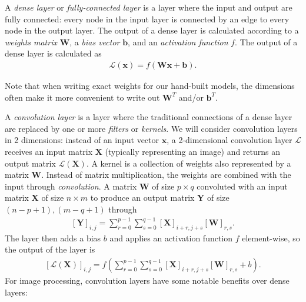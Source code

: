 \documentclass{somasmsc}
\begin{document}
A \textit{dense layer} or \textit{fully-connected layer} is a layer where the input and output are fully connected: every node in the input layer is connected by an edge to every node in the output layer. The output of a dense layer is calculated according to a \textit{weights matrix} $\mathbf{W}$, a \textit{bias vector} $\pmb{b}$, and an \textit{activation function} $f$. The output of a dense layer is calculated as
\begin{align*}
\mathcal{L}\left(\pmb{x}\right) = f(\mathbf{W}\pmb{x} + \pmb{b}).
\end{align*}

Note that when writing exact weights for our hand-built models, the dimensions often make it more convenient to write out $\mathbf{W}^T$ and/or $\pmb{b}^T$.

A \textit{convolution layer} is a layer where the traditional connections of a dense layer are replaced by one or more \textit{filters} or \textit{kernels}. We will consider convolution layers in 2 dimensions: instead of an input vector $\pmb{x}$, a 2-dimensional convolution layer $\mathcal{L}$ receives an input matrix $\mathbf{X}$ (typically representing an image) and returns an output matrix $\mathcal{L}\left(\mathbf{X}\right)$. A kernel is a collection of weights also represented by a matrix $\mathbf{W}$. Instead of matrix multiplication, the weights are combined with the input through \textit{convolution}. A matrix $\mathbf{W}$ of size $p \times q$ convoluted with an input matrix $\mathbf{X}$ of size $n \times m$ to produce an output matrix $\mathbf{Y}$ of size $\left(n-p+1\right),\left(m-q+1\right)$ through
\begin{align*}
\left[\mathbf{Y}\right]_{i,j} = \sum_{r=0}^{p-1} \sum_{s=0}^{q-1} \left[\mathbf{X}\right]_{i+r, j+s} \left[\mathbf{W}\right]_{r,s}.
\end{align*}
The layer then adds a bias $b$ and applies an activation function $f$ element-wise, so the output of the layer is
\begin{align*}
\left[\mathcal{L}\left(\mathbf{X}\right)\right]_{i,j} = f\left(\sum_{r=0}^{p-1} \sum_{s=0}^{q-1} \left[\mathbf{X}\right]_{i+r, j+s} \left[\mathbf{W}\right]_{r,s} + b\right).
\end{align*}
For image processing, convolution layers have some notable benefits over dense layers:
\end{document}
